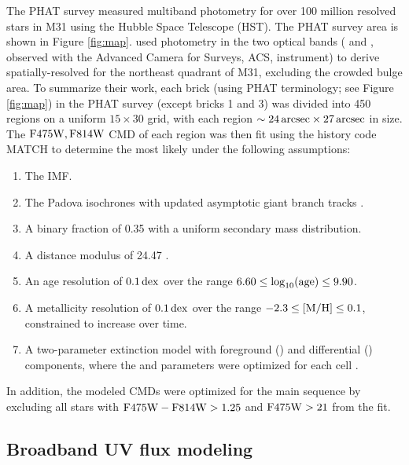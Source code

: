 \documentclass[iop, tighten]{emulateapj}
\begin{document}
The PHAT survey \citep{Dalcanton:2012} measured multiband photometry for over
100 million resolved stars in M31 using the Hubble Space Telescope (HST). The
PHAT survey area is shown in Figure \ref{fig:map}. \citet{Lewis:2014} used
photometry in the two optical bands (\acsb{} and \acsi{}, observed with the
Advanced Camera for Surveys, ACS, instrument) to derive spatially-resolved
 for the northeast quadrant of M31, excluding the crowded bulge area. To
summarize their work, each brick (using PHAT terminology; see Figure
\ref{fig:map}) in the PHAT survey (except bricks 1 and 3) was divided into 450
regions on a uniform $15 \times 30$ grid, with each region $\sim 24\,\mathrm{arcsec}
\times 27\,\mathrm{arcsec}$ in size. The $\mathrm{F475W},\mathrm{F814W}$ CMD of each region was then fit
using the \sfh{} history code MATCH \citep{Dolphin:2002} to determine the most
likely \sfh{} under the following assumptions:

\begin{enumerate}
\item The \citet{Kroupa:2001} IMF.
\item The Padova isochrones \citep{Marigo:2008} with updated asymptotic giant
    branch tracks \citep{Girardi:2010}.
\item A binary fraction of 0.35 with a uniform secondary mass distribution.
\item A distance modulus of 24.47 \citep{McConnachie:2005}.
\item An age resolution of $0.1\,\mathrm{dex}$ over the range $6.60 \le
    \log_{10}(\mathrm{age}) \le 9.90$.
\item A metallicity resolution of $0.1\,\mathrm{dex}$ over the range $-2.3 \le \mathrm{[M/H]} \le
    0.1$, constrained to increase over time.
\item A two-parameter extinction model with foreground (\avf{}) and
    differential (\dav{}) components, where the \avf{} and \dav{} parameters
    were optimized for each cell \citep[see also][]{Simones:2014}.
\end{enumerate}

In addition, the modeled CMDs were optimized for the main sequence by excluding
all stars with $\mathrm{F475W} - \mathrm{F814W} > 1.25$ and $\mathrm{F475W} > 21$ from the fit.



\subsection{Broadband UV flux modeling}\label{syntheticfluxmaps:fluxmod}
\end{document}
